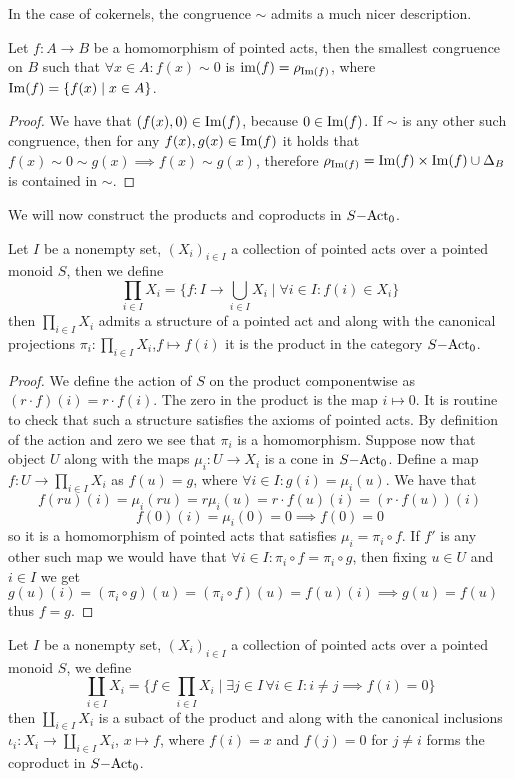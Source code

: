     In the case of cokernels, the congruence $\sim$ admits a much nicer description. 
\begin{proposition}
    Let $f: A \to B$ be a homomorphism of pointed acts, then the smallest congruence on $B$ such that $\forall x\in A :f(x)\sim 0$ is
    $\text{im}(f)=\rho_{\mathrm{Im}(f)}$, where $\mathrm{Im}(f) = \{f(x) \mid x\in A\}$.
\end{proposition}
\begin{proof}
    We have that $(f(x),0)\in\mathrm{Im}(f)$, because $0\in\mathrm{Im}(f)$. If $\sim$ is any other such congruence, then for any $f(x),g(x)\in\mathrm{Im}(f)$
    it holds that $f(x)\sim 0 \sim g(x) \implies f(x)\sim g(x)$, therefore $\rho_{\mathrm{Im}(f)}=\mathrm{Im}(f)\times\mathrm{Im}(f)\cup\Delta_B$ is contained in $\sim$.
\end{proof}
We will now construct the products and coproducts in $S\mathrm{-Act}_0$. 
\begin{proposition}
    Let $I$ be a nonempty set, $(X_i)_{i\in I}$ a collection of pointed acts over a pointed monoid $S$, then we define 
    \[
        \prod_{i\in I}X_i = \{f: I \to\bigcup_{i\in I } X_i \mid\forall i\in I :  f(i)\in X_i \}
    \]
    then $\prod_{i\in I}X_i$ admits a structure of a pointed act and along with the canonical projections 
    $\pi_i : \prod_{i\in I }X_i$,$f\mapsto f(i)$ it is the product in the category $S\mathrm{-Act}_0$.
\end{proposition}
\begin{proof}
    We define the action of $S$ on the product componentwise as $(r\cdot f)(i) = r\cdot f(i)$. The zero in the product 
    is the map $i\mapsto 0$. It is routine to check that such a structure satisfies the 
    axioms of pointed acts. By definition of the action and zero we see that $\pi_i$ is a homomorphism. Suppose now that 
    object $U$ along with the maps $\mu_i : U \to X_i$ is a cone in $S\mathrm{-Act}_0$. Define a map $f: U \to\prod_{i\in I} X_i$ 
    as $f(u) = g$, where $\forall i\in I : g(i) = \mu_i(u)$. We have that 
    \[
        f(ru)(i) = \mu_i(ru) = r\mu_i(u) = r\cdot f(u)(i) = (r\cdot f(u))(i)
    \]  
    \[
        f(0)(i) = \mu_i(0) = 0 \implies f(0) = 0
    \]
    so it is a homomorphism of pointed acts that satisfies $\mu_i = \pi_i\circ f$. If $f'$ is any other such map we would have that 
    $\forall i\in I : \pi_i\circ f = \pi_i\circ g$, then fixing $u\in U$ and $i\in I$ we get $g(u)(i) = (\pi_i \circ g)(u) = (\pi_i\circ f)(u) = f(u)(i) \implies g(u)=f(u)$ 
    thus $f=g$.
\end{proof}
\begin{proposition}
    Let $I$ be a nonempty set, $(X_i)_{i\in I}$ a collection of pointed acts over a pointed monoid $S$, we define 
    \[
        \coprod_{i\in I } X_i = \{f\in\prod_{i\in I }X_i \mid \exists j\in I\,\forall i\in I : i\neq j \implies f(i) = 0\}
    \]
    then $\coprod_{i\in I} X_i$ is a subact of the product and along with the canonical inclusions $\iota_i : X_i \to \coprod_{i\in I} X_i$, $x\mapsto f$, where 
    $f(i) = x$ and $f(j)=0$ for $j\neq i$
    forms the coproduct in $S\mathrm{-Act}_0$.
\end{proposition}
